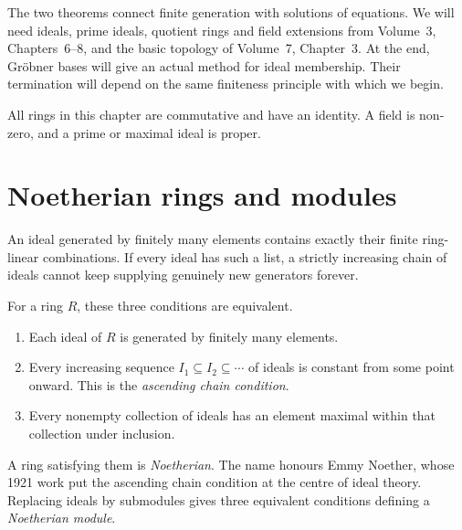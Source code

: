 The two theorems connect finite generation with solutions of equations. We will need ideals, prime ideals, quotient rings and field extensions from Volume~3, Chapters~6--8, and the basic topology of Volume~7, Chapter~3. At the end, Gröbner bases will give an actual method for ideal membership. Their termination will depend on the same finiteness principle with which we begin.

All rings in this chapter are commutative and have an identity. A field is non-zero, and a prime or maximal ideal is proper.

\section{Noetherian rings and modules}

An ideal generated by finitely many elements contains exactly their finite ring-linear combinations. If every ideal has such a list, a strictly increasing chain of ideals cannot keep supplying genuinely new generators forever.

\begin{proposition}\label{prop:noetherian}
For a ring $R$, these three conditions are equivalent.
\begin{enumerate}[label=(\alph*)]
\item Each ideal of $R$ is generated by finitely many elements.
\item Every increasing sequence $I_1\subseteq I_2\subseteq\cdots$ of ideals is constant from some point onward. This is the \emph{ascending chain condition}.
\item Every nonempty collection of ideals has an element maximal within that collection under inclusion.
\end{enumerate}
A ring satisfying them is \emph{Noetherian}. The name honours Emmy Noether, whose 1921 work put the ascending chain condition at the centre of ideal theory. Replacing ideals by submodules gives three equivalent conditions defining a \emph{Noetherian module}.
\end{proposition}

